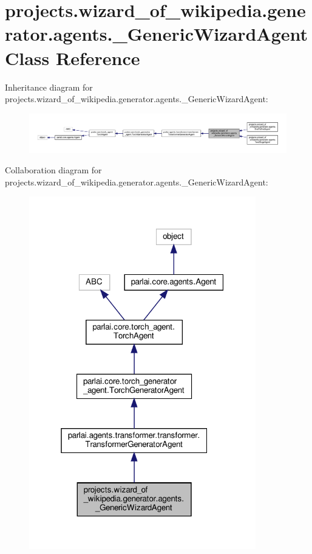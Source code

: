 \hypertarget{classprojects_1_1wizard__of__wikipedia_1_1generator_1_1agents_1_1__GenericWizardAgent}{}\section{projects.\+wizard\+\_\+of\+\_\+wikipedia.\+generator.\+agents.\+\_\+\+Generic\+Wizard\+Agent Class Reference}
\label{classprojects_1_1wizard__of__wikipedia_1_1generator_1_1agents_1_1__GenericWizardAgent}


Inheritance diagram for projects.\+wizard\+\_\+of\+\_\+wikipedia.\+generator.\+agents.\+\_\+\+Generic\+Wizard\+Agent\+:\nopagebreak
\begin{figure}[H]
\begin{center}
\leavevmode
\includegraphics[width=350pt]{d5/df6/classprojects_1_1wizard__of__wikipedia_1_1generator_1_1agents_1_1__GenericWizardAgent__inherit__graph}
\end{center}
\end{figure}


Collaboration diagram for projects.\+wizard\+\_\+of\+\_\+wikipedia.\+generator.\+agents.\+\_\+\+Generic\+Wizard\+Agent\+:
\nopagebreak
\begin{figure}[H]
\begin{center}
\leavevmode
\includegraphics[width=280pt]{dc/d24/classprojects_1_1wizard__of__wikipedia_1_1generator_1_1agents_1_1__GenericWizardAgent__coll__graph}
\end{center}
\end{figure}
